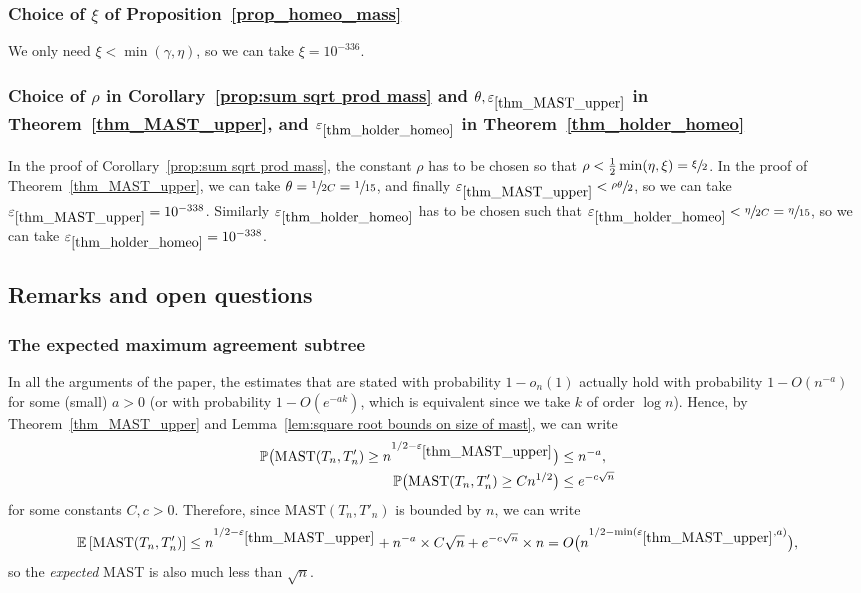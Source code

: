 \documentclass[11pt]{article}
\newcommand{\Subsection}{\subsection}
\newcommand{\Ec}[1]{\mathbb{E} \left[#1\right]}
\newcommand{\bPp}[1]{\mathbb{P} \bigl(#1\bigr)}
\newcommand{\MAST}{\mathrm{MAST}}
\let\eps\varepsilon
\theoremstyle{plain}
\theoremstyle{definition}
\numberwithin{equation}{section}
\begin{document}
\subsubsection*{Choice of $\xi$ of Proposition~\ref{prop_homeo_mass}}
We only need $\xi < \min(\gamma,\eta)$, so we can take $\xi = 10^{-336}$.
\subsubsection*{Choice of $\rho$ in Corollary~\ref{prop:sum sqrt prod mass} and $\theta, \eps_{\ref{thm_MAST_upper}}$ in Theorem~\ref{thm_MAST_upper}, and $\eps_{\ref{thm_holder_homeo}}$ in Theorem~\ref{thm_holder_homeo}}
In the proof of Corollary~\ref{prop:sum sqrt prod mass}, the constant $\rho$ has to be chosen so that $\rho < \frac{1}{2}\min(\eta,\xi)=\sfrac{\xi}{2}$. In the proof of Theorem~\ref{thm_MAST_upper}, we can take $\theta=\sfrac{1}{2C}=\sfrac{1}{15}$, and finally $\eps_{\ref{thm_MAST_upper}}< \sfrac{\rho\theta}{2}$, so we can take $\eps_{\ref{thm_MAST_upper}}=10^{-338}$.
Similarly $\eps_{\ref{thm_holder_homeo}}$ has to be chosen such that $\eps_{\ref{thm_holder_homeo}} < \sfrac{\eta}{2C}=\sfrac{\eta}{15}$, so we can take $\eps_{\ref{thm_holder_homeo}}=10^{-338}$.

\Subsection{Remarks and open questions}\label{subsec:discussion}

\subsubsection*{The expected maximum agreement subtree}
In all the arguments of the paper, the estimates that are stated with probability $1-o_n(1)$ actually hold with probability $1-O(n^{-a})$ for some (small) $a>0$ (or with probability $1-O(e^{-ak})$, which is equivalent since we take $k$ of order $\log n$). Hence, by Theorem~\ref{thm_MAST_upper} and Lemma~\ref{lem:square root bounds on size of mast}, we can write
\begin{align*}
\bPp{\MAST(T_n,T'_n) \geq n^{1/2-\eps_{\ref{thm_MAST_upper}}}} &\leq n^{-a},\\
\bPp{\MAST(T_n,T'_n) \geq Cn^{1/2}} &\leq e^{-c\sqrt{n}}
\end{align*}
for some constants $C,c>0$. Therefore, since $\MAST(T_n,T'_n)$ is bounded by $n$, we can write
\[ \Ec{\MAST(T_n,T'_n)} \leq n^{1/2-\eps_{\ref{thm_MAST_upper}}} + n^{-a} \times C\sqrt{n} + e^{-c\sqrt{n}} \times n = O \bigl( n^{1/2-\min(\eps_{\ref{thm_MAST_upper}},a)} \bigr),\]
so the \emph{expected} MAST is also much less than $\sqrt{n}$.
\end{document}
